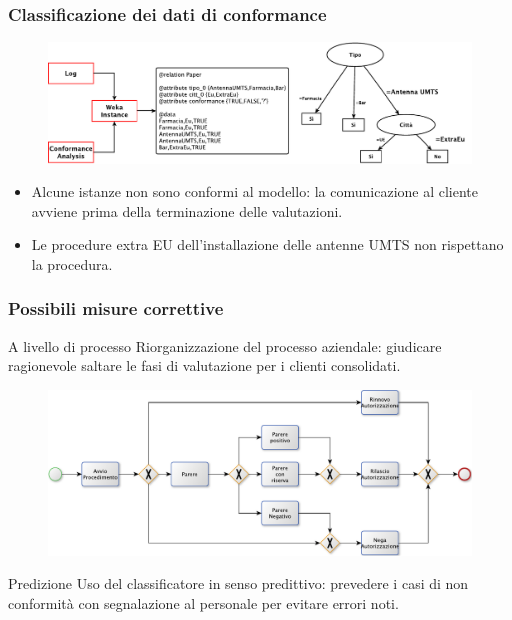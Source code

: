 
\begin{frame}
	\frametitle{Classificazione dei dati di conformance}
	\begin{figure}
	\includegraphics[scale=0.6]{./fig/decisiontree1}
	\end{figure}
	\begin{block}{}
	\begin{itemize}
	\item Alcune istanze non sono conformi al modello: la comunicazione al cliente avviene prima della terminazione delle valutazioni.
	\item Le procedure extra EU dell'installazione delle antenne UMTS non rispettano la procedura.
	\end{itemize}
	\end{block}
	\end{frame}
	
	\begin{frame}
	\frametitle{Possibili misure correttive}
	\begin{block}{A livello di processo}
	Riorganizzazione del processo aziendale: giudicare ragionevole saltare le fasi di valutazione per i clienti consolidati.
	\end{block}
	\begin{figure}
	\includegraphics[scale=0.4]{./fig/BPMN}
	\end{figure}
	\begin{block}{Predizione}
	Uso del classificatore in senso predittivo: prevedere i casi di non conformit\`{a} con segnalazione al personale per evitare errori noti.  
	\end{block}
	\end{frame}
	